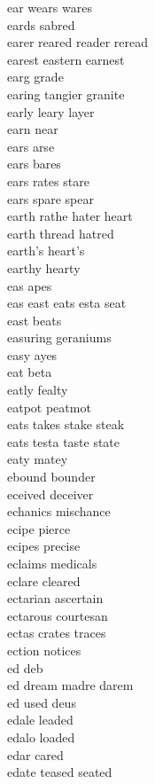 ear wears wares  \\
eards sabred \\
earer reared reader reread \\
earest eastern earnest \\
earg grade \\
earing tangier granite \\
early leary layer\\
earn near\\
ears arse\\
ears bares \\
ears rates stare \\
ears spare spear \\
earth rathe hater heart\\
earth thread hatred \\
earth's heart's\\
earthy hearty\\
eas apes \\
eas east eats esta seat \\
east beats \\
easuring geraniums \\
easy ayes\\
eat beta \\
eatly fealty \\
eatpot peatmot \\
eats takes stake steak \\
eats testa taste state \\
eaty matey \\
ebound bounder \\
eceived deceiver \\
echanics mischance \\
ecipe pierce \\
ecipes precise \\
eclaims medicals \\
eclare cleared \\
ectarian ascertain \\
ectarous courtesan \\
ectas crates traces \\
ection notices \\
ed deb \\
ed dream madre darem   \\
ed used deus  \\
edale leaded \\
edalo loaded \\
edar cared \\
edate teased seated \\
